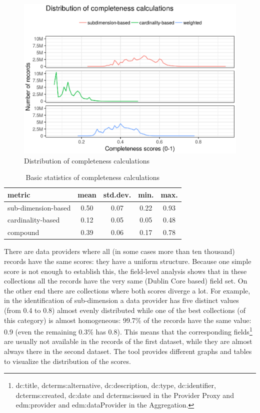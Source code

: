 \begin{figure}[ht]
\includegraphics[width=\textwidth]{images/chapter02/completeness-score-histogram.eps}
\centering
\caption{Distribution of completeness calculations}
\label{figure:completeness}
\end{figure}

\begin{table}
\caption{Basic statistics of completeness calculations}
\label{table:completeness_metrics}
\centering
\begin{tabular}{l|c|c|c|c}
metric & mean & std.dev. & min. & max. \\
\hline
sub-dimension-based & 0.50 & 0.07 & 0.22 & 0.93 \\
cardinality-based & 0.12 & 0.05 & 0.05 & 0.48 \\
compound & 0.39 & 0.06 & 0.17 & 0.78 \\
\end{tabular}
\end{table}

There are data providers where all (in some cases more than ten thousand) records have the same scores: they have a uniform structure. Because one simple score is not enough to establish this, the field-level analysis shows that in these collections all the records have the very same (Dublin Core based) field set. On the other end there are collections where both scores diverge a lot. For example, in the identification of sub-dimension a data provider has five distinct values (from 0.4 to 0.8) almost evenly distributed while one of the best collections (of this category) is almost homogeneous: 99.7\% of the records have the same value: 0.9 (even the remaining 0.3\% has 0.8). This means that the corresponding fields\footnote{dc:title, dcterms:alternative, dc:description, dc:type, dc:identifier, dcterms:created, dc:date and dcterms:issued in the Provider Proxy and edm:provider and edm:dataProvider in the Aggregation.} are usually not available in the records of the first dataset, while they are almost always there in the second dataset. The tool provides different graphs and tables to visualize the distribution of the scores. 

